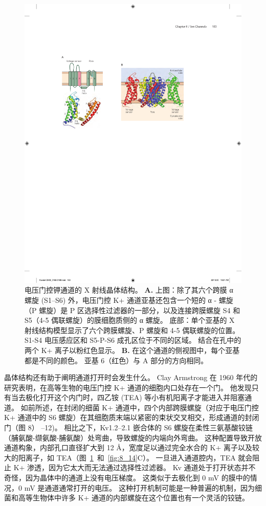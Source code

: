 \begin{figure}[htbp]
	\centering
	\includegraphics[width=0.5\linewidth]{chap08/fig_8_13}
	\caption{电压门控钾通道的 X 射线晶体结构\cite{long2007atomic}。
		\textbf{A.} 上图：除了其六个跨膜 α 螺旋 (S1–S6) 外，电压门控 K+ 通道亚基还包含一个短的 α - 螺旋（P 螺旋）是 P 区选择性过滤器的一部分，以及连接跨膜螺旋 S4 和 S5（4-5 偶联螺旋）的膜细胞质侧的 α 螺旋。
		底部：单个亚基的 X 射线结构模型显示了六个跨膜螺旋、P 螺旋和 4-5 偶联螺旋的位置。
		S1-S4 电压感应区和 S5-P-S6 成孔区位于不同的区域。
		结合在孔中的两个 K+ 离子以粉红色显示。
		\textbf{B.} 在这个通道的侧视图中，每个亚基都是不同的颜色。
		亚基 6（红色）与 A 部分的方向相同。}
	\label{fig:8_13}
\end{figure}


晶体结构还有助于阐明通道打开时会发生什么。
Clay Armstrong 在 1960 年代的研究表明，在高等生物的电压门控 K+ 通道的细胞内口处存在一个门。
他发现只有当去极化打开这个内门时，四乙铵 (TEA) 等小有机阳离子才能进入并阻塞通道。
如前所述，在封闭的细菌 K+ 通道中，四个内部跨膜螺旋（对应于电压门控 K+ 通道中的 S6 螺旋）在其细胞质末端以紧密的束状交叉相交，形成通道的封闭门（图 8） –12)。
相比之下，Kv1.2–2.1 嵌合体的 S6 螺旋在柔性三氨基酸铰链（脯氨酸-缬氨酸-脯氨酸）处弯曲，导致螺旋的内端向外弯曲。
这种配置导致开放通道构象，内部孔口直径扩大到 12 Å，宽度足以通过完全水合的 K+ 离子以及较大的阳离子，如 TEA（图~\ref{fig:8_13}~和~\ref{fig:8_14}C）。
一旦进入通道腔内，TEA 就会阻止 K+ 渗透，因为它太大而无法通过选择性过滤器。
Kv 通道处于打开状态并不奇怪，因为晶体中的通道上没有电压梯度。
这类似于去极化到 0 mV 的膜中的情况，0 mV 是通道通常打开的电压。
这种打开机制可能是一种普遍的机制，因为细菌和高等生物体中许多 K+ 通道的内部螺旋在这个位置也有一个灵活的铰链。


